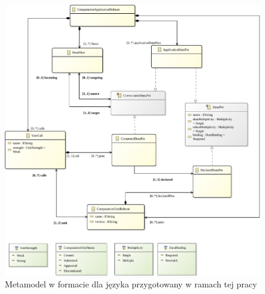 \begin{figure}[!hb]
	\centering

	\includegraphics[width=0.92\linewidth]{./images/cal-emf-metamodel.pdf}
	\caption{Metamodel w formacie \Ecore{} dla języka \CAL{} przygotowany w
		ramach tej pracy}\label{rys:cal-emf-metamodel}
\end{figure}

